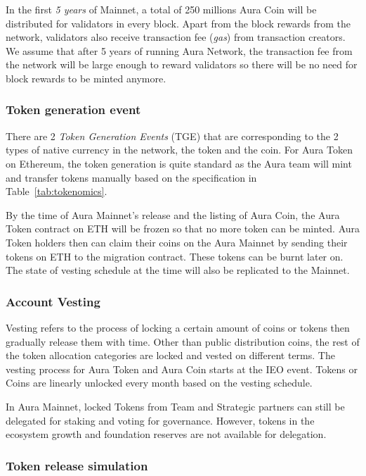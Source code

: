 \documentclass[11pt, titlepage]{article}
\begin{document}
In the first \emph{5 years} of Mainnet, a total of 250 millions Aura Coin will be distributed for validators in every block. Apart from the block rewards from the network, validators also receive transaction fee (\emph{gas}) from transaction creators. We assume that after 5 years of running Aura Network, the transaction fee from the network will be large enough to reward validators so there will be no need for block rewards to be minted anymore.

\subsubsection{Token generation event}
There are 2 \emph{Token Generation Events} (TGE) that are corresponding to the 2 types of native currency in the network, the token and the coin. For Aura Token on Ethereum, the token generation is quite standard as the Aura team will mint and transfer tokens manually based on the specification in Table~\ref{tab:tokenomics}.

By the time of Aura Mainnet's release and the listing of Aura Coin, the Aura Token contract on ETH will be frozen so that no more token can be minted. Aura Token holders then can claim their coins on the Aura Mainnet by sending their tokens on ETH to the migration contract. These tokens can be burnt later on. The state of vesting schedule at the time will also be replicated to the Mainnet. 

\subsubsection{Account Vesting}
Vesting refers to the process of locking a certain amount of coins or tokens then gradually release them with time. Other than public distribution coins, the rest of the token allocation categories are locked and vested on different terms. The vesting process for Aura Token and Aura Coin starts at the IEO event. Tokens or Coins are linearly unlocked every month based on the vesting schedule. 

In Aura Mainnet, locked Tokens from Team and Strategic partners can still be delegated for staking and voting for governance. However, tokens in the ecosystem growth and foundation reserves are not available for delegation. 

\subsubsection{Token release simulation}
\end{document}
